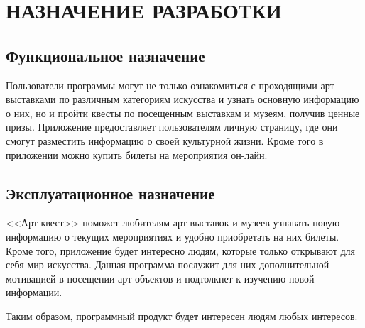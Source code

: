 \pagestyle{fancy}


\section{НАЗНАЧЕНИЕ РАЗРАБОТКИ}


\subsection{Функциональное назначение} 
	
\hspace{10mm} Пользователи программы могут не только ознакомиться с проходящими арт-выставками по различным категориям искусства и узнать основную информацию о них, но и пройти квесты по посещенным выставкам и музеям, получив ценные призы. Приложение предоставляет пользователям личную страницу, где они смогут разместить информацию о своей культурной жизни. Кроме того в приложении можно купить билеты на мероприятия он-лайн.
	
\subsection{Эксплуатационное назначение}

\hspace{10mm} <<Арт-квест>> поможет любителям арт-выставок и музеев узнавать новую информацию о текущих мероприятиях и удобно приобретать на них билеты. Кроме того, приложение будет интересно людям, которые только открывают для себя мир искусства. Данная программа послужит для них дополнительной мотивацией в посещении арт-объектов и подтолкнет к изучению новой информации.

\hspace{10mm} Таким образом, программный продукт будет интересен людям любых интересов.
